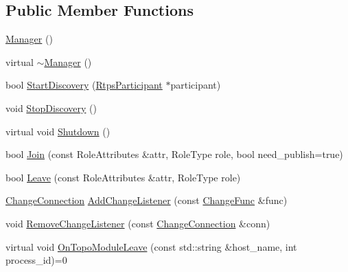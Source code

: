 \subsection*{Public Member Functions}
\begin{DoxyCompactItemize}
\item 
\hyperlink{classapollo_1_1cyber_1_1service__discovery_1_1Manager_a8bc33aa7aefffcaa50ebf3ca12b4dd48}{Manager} ()
\item 
virtual \hyperlink{classapollo_1_1cyber_1_1service__discovery_1_1Manager_ae683108196b8958825bb4142ab98a378}{$\sim$\-Manager} ()
\item 
bool \hyperlink{classapollo_1_1cyber_1_1service__discovery_1_1Manager_a0a007e927b14cb2584a9b97b1c8ec299}{Start\-Discovery} (\hyperlink{classapollo_1_1cyber_1_1service__discovery_1_1Manager_a7576b9ac293ff99af06e30a971df5dce}{Rtps\-Participant} $\ast$participant)
\item 
void \hyperlink{classapollo_1_1cyber_1_1service__discovery_1_1Manager_ae06ca49d144ab1ca78cfd30f204e4caa}{Stop\-Discovery} ()
\item 
virtual void \hyperlink{classapollo_1_1cyber_1_1service__discovery_1_1Manager_a4a4e6fc42da96478d0ff6ca5d8f21ad7}{Shutdown} ()
\item 
bool \hyperlink{classapollo_1_1cyber_1_1service__discovery_1_1Manager_a21da44e9c4c3fe10af7005c4d5eec894}{Join} (const Role\-Attributes \&attr, Role\-Type role, bool need\-\_\-publish=true)
\item 
bool \hyperlink{classapollo_1_1cyber_1_1service__discovery_1_1Manager_abf37a1b3c4f23425fcdbd46ec0a3b632}{Leave} (const Role\-Attributes \&attr, Role\-Type role)
\item 
\hyperlink{classapollo_1_1cyber_1_1service__discovery_1_1Manager_ab43fa282f6aa1b3b1180a1e416b98b68}{Change\-Connection} \hyperlink{classapollo_1_1cyber_1_1service__discovery_1_1Manager_abe0325759c5c14d16cfe2e2b1460b9ce}{Add\-Change\-Listener} (const \hyperlink{classapollo_1_1cyber_1_1service__discovery_1_1Manager_a1e08b690a5829fbabeb6d3aea5ab8320}{Change\-Func} \&func)
\item 
void \hyperlink{classapollo_1_1cyber_1_1service__discovery_1_1Manager_a2e46899f22d9e001b10a7e49ef61bd0c}{Remove\-Change\-Listener} (const \hyperlink{classapollo_1_1cyber_1_1service__discovery_1_1Manager_ab43fa282f6aa1b3b1180a1e416b98b68}{Change\-Connection} \&conn)
\item 
virtual void \hyperlink{classapollo_1_1cyber_1_1service__discovery_1_1Manager_a95a679e0fc7904e6f1a8b2fdd139cc03}{On\-Topo\-Module\-Leave} (const std\-::string \&host\-\_\-name, int process\-\_\-id)=0
\end{DoxyCompactItemize}
